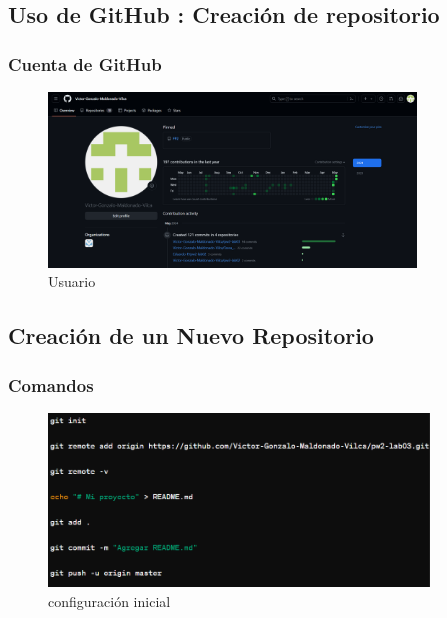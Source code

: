 \documentclass{article}
\begin{document}
    \subsection{Uso de GitHub : Creación de repositorio}
    
	\subsubsection{Cuenta de GitHub}
	\begin{figure}[H]
		\centering
		\includegraphics[width=0.87\textwidth,keepaspectratio]{img/usuario.png}
		\caption{Usuario}
	\end{figure}
	\subsection{Creación de un Nuevo Repositorio}
	\subsubsection{Comandos}
	\begin{figure}[H]
		\centering
		\includegraphics[width=0.9\textwidth,keepaspectratio]{img/Comandos_Iniciales.png}
		\caption{configuración inicial}
	\end{figure}
	\newpage
\end{document}
